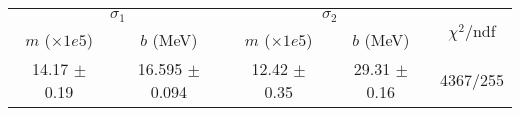 \begin{tabular}{cc|cc||c}
\multicolumn{2}{c|}{$\sigma_1$} & \multicolumn{2}{|c}{$\sigma_2$}  & \multirow{2}{*}{$\chi^2/$ndf}\\
$m$ ($\times1e5$) & $b$ (MeV) & $m$ ($\times1e5$) & $b$ (MeV)  & \\
\hline
14.17 $\pm$ 0.19 & 16.595 $\pm$ 0.094 & 12.42 $\pm$ 0.35 & 29.31 $\pm$ 0.16 & 4367/255\\
\end{tabular}
